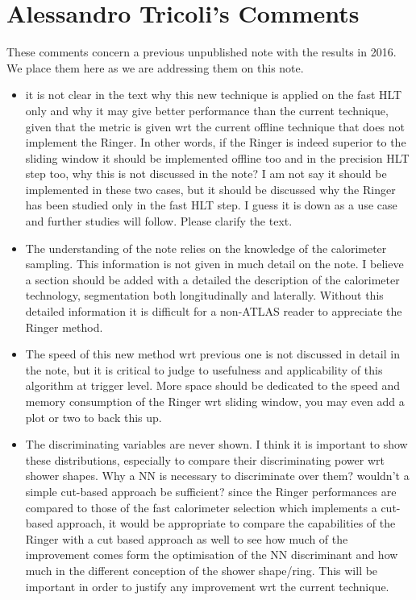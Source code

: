 \section{Alessandro Tricoli's Comments}%
\label{sec:alessandro_comments}

These comments concern a previous unpublished note with the \rnn{} results in
2016. We place them here as we are addressing them on this note.

\begin{itemize}
\item it is not clear in the text why this new technique is applied on
the fast HLT only and why it may give better performance than the current
technique, given that the metric is given wrt the current offline technique that
does not implement the Ringer. In other words, if the Ringer is indeed superior
to the sliding window it should be implemented offline too and in the precision
HLT step too, why this is not discussed in the note? I am not say it should be
implemented in these two cases, but it should be discussed why the Ringer has
been studied only in the fast HLT step. I guess it is down as a use case and
further studies will follow. Please clarify the text.

\item The understanding of the note relies on the knowledge of the calorimeter
sampling. This information is not given in much detail on the note. I believe a
section should be added with a detailed the description of the calorimeter
technology, segmentation both longitudinally and laterally. Without this
detailed information it is difficult for a non-ATLAS reader to appreciate the
Ringer method.

\item The speed of this new method wrt previous one is not discussed in detail in
the note, but it is critical to judge to usefulness and applicability of this
algorithm at trigger level. More space should be dedicated to the speed and
memory consumption of the Ringer wrt sliding window, you may even add a plot or
two to back this up.

\item The discriminating variables are never shown. I think it is important to show
these distributions, especially to compare their discriminating power wrt shower
shapes. Why a NN is necessary to discriminate over them? wouldn't a simple
cut-based approach  be sufficient? since the Ringer performances are compared to
those of the fast calorimeter selection which implements a cut-based approach,
it would be appropriate to compare the capabilities of the Ringer with a cut
based approach as well to see how much of the improvement comes form the
optimisation of the NN discriminant and how much in the different conception of
the shower shape/ring. This will be important in order to justify any
improvement wrt the current technique.


\end{itemize}
